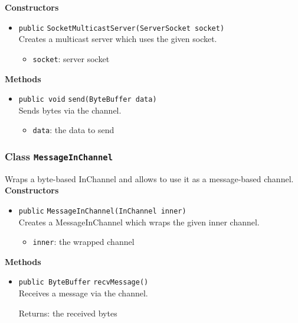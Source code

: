 \textbf{Constructors}
\begin{itemize}
\item \lstinline|public| \lstinline|SocketMulticastServer|\lstinline|(ServerSocket socket)|\\
Creates a multicast server which uses the given socket.
\begin{itemize}
\item \lstinline|socket|: server socket
\end{itemize}



\end{itemize}


\textbf{Methods}
\begin{itemize}
\item \lstinline|public void| \lstinline|send|\lstinline|(ByteBuffer data)|\\
Sends bytes via the channel.
\begin{itemize}
\item \lstinline|data|: the data to send
\end{itemize}



\end{itemize}

\subsubsection{Class \lstinline|MessageInChannel|}
Wraps a byte-based InChannel and allows to use it as a message-based
 channel. \\




\textbf{Constructors}
\begin{itemize}
\item \lstinline|public| \lstinline|MessageInChannel|\lstinline|(InChannel inner)|\\
Creates a MessageInChannel which wraps the given inner channel.
\begin{itemize}
\item \lstinline|inner|: the wrapped channel
\end{itemize}



\end{itemize}


\textbf{Methods}
\begin{itemize}
\item \lstinline|public ByteBuffer| \lstinline|recvMessage|\lstinline|()|\\
Receives a message via the channel.

Returns: the received bytes

\end{itemize}

